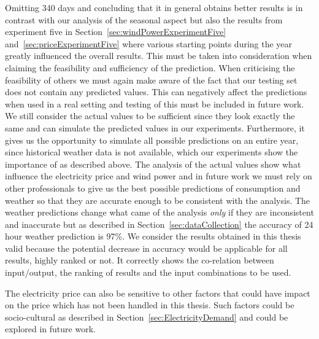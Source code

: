Omitting 340 days and concluding that it in general obtains better results is in contrast with our analysis of the seasonal aspect but also the results from experiment five in Section~\ref{sec:windPowerExperimentFive} and~\ref{sec:priceExperimentFive} where various starting points during the year greatly influenced the overall results. This must be taken into consideration when claiming the feasibility and sufficiency of the prediction. When criticising the feasibility of others we must again make aware of the fact that our testing set does not contain any predicted values. This can negatively affect the predictions when used in a real setting and testing of this must be included in future work. We still consider the actual values to be sufficient since they look exactly the same and can simulate the predicted values in our experiments. Furthermore, it gives us the opportunity to simulate all possible predictions on an entire year, since historical weather data is not available, which our experiments show the importance of as described above. The analysis of the actual values show what influence the electricity price and wind power and in future work we must rely on other professionals to give us the best possible predictions of consumption and weather so that they are accurate enough to be consistent with the analysis. The weather predictions change what came of the analysis \emph{only} if they are inconsistent and inaccurate but as described in Section~\ref{sec:dataCollection} the accuracy of 24 hour weather prediction is 97\%. We consider the results obtained in this thesis valid because the potential decrease in accuracy would be applicable for all results, highly ranked or not. It correctly shows the co-relation between input/output, the ranking of results and the input combinations to be used.

The electricity price can also be sensitive to other factors that could have impact on the price which has not been handled in this thesis. Such factors could be socio-cultural as described in Section~\ref{sec:ElectricityDemand} and could be explored in future work.